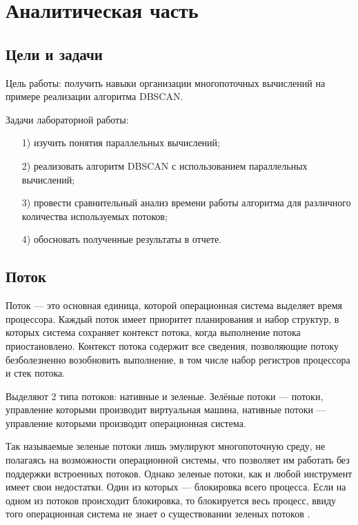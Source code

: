 \chapter{Аналитическая часть}

\section{Цели и задачи}

Цель работы: получить навыки организации многопоточных вычислений на примере реализации алгоритма DBSCAN.

Задачи лабораторной работы:
\begin{enumerate}
	\item[1)] изучить понятия параллельных вычислений;
	\item[2)] реализовать алгоритм DBSCAN с использованием параллельных вычислений;
	\item[3)] провести сравнительный анализ времени работы алгоритма для различного количества используемых потоков;
	\item[4)] обосновать полученные результаты в отчете.
\end{enumerate}

\section{Поток}

Поток --- это основная единица, которой операционная  система выделяет время процессора.
Каждый поток имеет приоритет  планирования и набор структур, в которых система сохраняет контекст  потока, когда выполнение потока приостановлено. Контекст потока  содержит все сведения, позволяющие потоку безболезненно возобновить выполнение, в том числе набор регистров процессора и стек потока.

Выделяют 2 типа потоков: нативные и зеленые.
Зелёные потоки --- потоки, управление которыми производит виртуальная машина, нативные потоки --- управление которыми производит операционная система.

Так называемые зеленые потоки лишь эмулируют многопоточную среду, не полагаясь на возможности операционной системы, что позволяет им работать без поддержки встроенных потоков.
Однако зеленые потоки, как и любой инструмент имеет свои недостатки.
Один из которых --- блокировка всего процесса.
Если на одном из потоков происходит блокировка, то блокируется весь процесс, ввиду того операционная система не знает о существовании зеленых потоков \cite{threads}.

